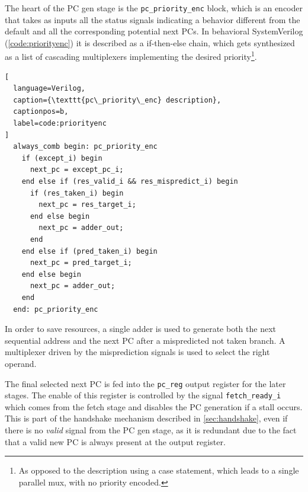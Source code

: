 The heart of the \ac{PC} gen stage is the \texttt{pc\_priority\_enc} block, which is an encoder that takes as inputs all the status signals indicating a behavior different from the default and all the corresponding potential next \acp{PC}. In behavioral SystemVerilog (\cref{code:priorityenc}) it is described as a if-then-else chain, which gets synthesized as a list of cascading multiplexers implementing the desired priority\footnote{As opposed to the description using a case statement, which leads to a single parallel mux, with no priority encoded.}.
\begin{lstlisting}[
  language=Verilog,
  caption={\texttt{pc\_priority\_enc} description},
  captionpos=b,
  label=code:priorityenc
]
  always_comb begin: pc_priority_enc
    if (except_i) begin
      next_pc = except_pc_i;
    end else if (res_valid_i && res_mispredict_i) begin
      if (res_taken_i) begin
        next_pc = res_target_i;
      end else begin
        next_pc = adder_out;
      end
    end else if (pred_taken_i) begin
      next_pc = pred_target_i;
    end else begin
      next_pc = adder_out;
    end
  end: pc_priority_enc
\end{lstlisting}

In order to save resources, a single adder is used to generate both the next sequential address and the next \ac{PC} after a mispredicted not taken branch. A multiplexer driven by the misprediction signals is used to select the right operand.

The final selected next \ac{PC} is fed into the \texttt{pc\_reg} output register for the later stages. The enable of this register is controlled by the signal \texttt{fetch\_ready\_i} which comes from the fetch stage and disables the \ac{PC} generation if a stall occurs. This is part of the handshake mechanism described in \cref{sec:handshake}, even if there is no \emph{valid} signal from the \ac{PC} gen stage, as it is redundant due to the fact that a valid new \ac{PC} is always present at the output register.

